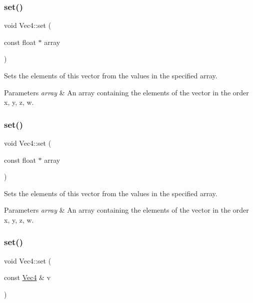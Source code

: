 \subsubsection{\texorpdfstring{set()}{set()}\hspace{0.1cm}{\footnotesize\ttfamily [3/8]}}
{\footnotesize\ttfamily void Vec4\+::set (\begin{DoxyParamCaption}\item[{const float $\ast$}]{array }\end{DoxyParamCaption})}

Sets the elements of this vector from the values in the specified array.


\begin{DoxyParams}{Parameters}
{\em array} & An array containing the elements of the vector in the order x, y, z, w. \\
\hline
\end{DoxyParams}
\mbox{\label{classVec4_aa3e7f9a7fbb88c0407fc1ec79e2691db}} 
\subsubsection{\texorpdfstring{set()}{set()}\hspace{0.1cm}{\footnotesize\ttfamily [4/8]}}
{\footnotesize\ttfamily void Vec4\+::set (\begin{DoxyParamCaption}\item[{const float $\ast$}]{array }\end{DoxyParamCaption})}

Sets the elements of this vector from the values in the specified array.


\begin{DoxyParams}{Parameters}
{\em array} & An array containing the elements of the vector in the order x, y, z, w. \\
\hline
\end{DoxyParams}
\mbox{\label{classVec4_ab247286076dd5b9d7d88e8b5a73d636a}} 
\subsubsection{\texorpdfstring{set()}{set()}\hspace{0.1cm}{\footnotesize\ttfamily [5/8]}}
{\footnotesize\ttfamily void Vec4\+::set (\begin{DoxyParamCaption}\item[{const \hyperlink{classVec4}{Vec4} \&}]{v }\end{DoxyParamCaption})}

